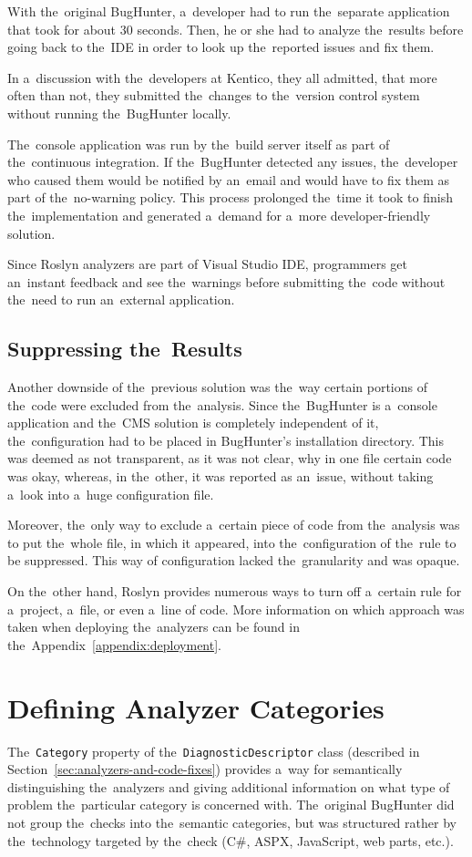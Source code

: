 \documentclass[
  digital, %
  table,   %
  lof,     %
  lot,     %
  oneside,
]{fithesis3}
\begin{document}
With the~original BugHunter, a~developer had to run the~separate application that took for about 30 seconds. Then, he or she had to analyze the~results before going back to the~IDE in order to look up the~reported issues and fix them. 

In a~discussion with the~developers at Kentico, they all admitted, that more often than not, they submitted the~changes to the~version control system without running the~BugHunter locally. 

The~console application was run by the~build server itself as part of the~continuous integration. If the~BugHunter detected any issues, the~developer who caused them would be notified by an~email and would have to fix them as part of the~no-warning policy. This process prolonged the~time it took to finish the~implementation and generated a~demand for a~more developer-friendly solution. 

Since Roslyn analyzers are part of Visual Studio IDE, programmers get an~instant feedback and see the~warnings before submitting the~code without the~need to run an~external application.

\subsection{Suppressing the~Results}
Another downside of the~previous solution was the~way certain portions of the~code were excluded from the~analysis. Since the~BugHunter is a~console application and the~CMS solution is completely independent of it, the~configuration had to be placed in BugHunter's installation directory. This was deemed as not transparent, as it was not clear, why in one file certain code was okay, whereas, in the~other, it was reported as an~issue, without taking a~look into a~huge configuration file.

Moreover, the~only way to exclude a~certain piece of code from the~analysis was to put the~whole file, in which it appeared, into the~configuration of the~rule to be suppressed. This way of configuration lacked the~granularity and was opaque. 

On the~other hand, Roslyn provides numerous ways to turn off a~certain rule for a~project, a~file, or even a~line of code. More information on which approach was taken when deploying the~analyzers can be found in the~Appendix~\ref{appendix:deployment}.

\section{Defining Analyzer Categories}
\label{sec:analyzer-categories}
The~\texttt{Category} property of the~\texttt{DiagnosticDescriptor} class (described in Section~\ref{sec:analyzers-and-code-fixes}) provides a~way for semantically distinguishing the~analyzers and giving additional information on what type of problem the~particular category is concerned with. The~original BugHunter did not group the~checks into the~semantic categories, but was structured rather by the~technology targeted by the~check (C\#, ASPX, JavaScript, web parts, etc.). 
\end{document}
